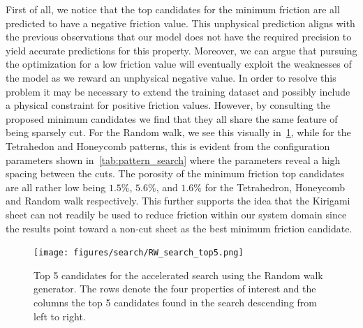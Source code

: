 First of all, we notice that the top candidates for the minimum friction are all
predicted to have a negative friction value. This unphysical prediction aligns
with the previous observations that our model does not have the required
precision to yield accurate predictions for this property. Moreover, we can
argue that pursuing the optimization for a low friction value will eventually
exploit the weaknesses of the model as we reward an unphysical negative value.
In order to resolve this problem it may be necessary to extend the training
dataset and possibly include a physical constraint for positive friction values.
However, by consulting the proposed minimum candidates we find that they all
share the same feature of being sparsely cut. For the Random walk, we see this
visually in~\cref{fig:RW_search_top5}, while for the Tetrahedon and Honeycomb
patterns, this is evident from the configuration parameters shown
in~\cref{tab:pattern_search} where the parameters reveal a high spacing between
the cuts. The porosity of the minimum friction top candidates are all rather low
being $1.5\%$, $5.6\%$, and $1.6\%$ for the Tetrahedron, Honeycomb and Random
walk respectively. This further supports the idea that the Kirigami sheet can
not readily be used to reduce friction within our system domain since the
results point toward a non-cut sheet as the best minimum friction candidate.


\begin{figure}[!htb]
  \centering
  \texttt{[image: figures/search/RW\_search\_top5.png]}
  \caption{Top 5 candidates for the accelerated search using the Random walk generator. The rows denote the four properties of interest and the columns the top 5 candidates found in the search descending from left to right. }
  \label{fig:RW_search_top5}
\end{figure}  


